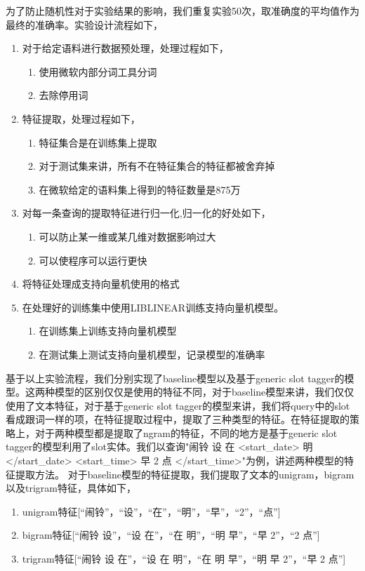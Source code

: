 \documentclass[master]{njuthesis}
\begin{document}
\begin{enumerate}
     为了防止随机性对于实验结果的影响，我们重复实验50次，取准确度的平均值作为最终的准确率。实验设计流程如下，
\begin{enumerate}
  \item 对于给定语料进行数据预处理，处理过程如下，
    \begin{enumerate}
      \item 使用微软内部分词工具分词
      \item 去除停用词
    \end{enumerate}
  \item 特征提取，处理过程如下，
    \begin{enumerate}
      \item 特征集合是在训练集上提取
      \item 对于测试集来讲，所有不在特征集合的特征都被舍弃掉
      \item 在微软给定的语料集上得到的特征数量是875万
    \end{enumerate}
  \item 对每一条查询的提取特征进行归一化,归一化的好处如下，
    \begin{enumerate}
      \item 可以防止某一维或某几维对数据影响过大
      \item 可以使程序可以运行更快
    \end{enumerate}
  \item 将特征处理成支持向量机使用的格式
  \item 在处理好的训练集中使用LIBLINEAR训练支持向量机模型。
    \begin{enumerate}
      \item 在训练集上训练支持向量机模型
      \item 在测试集上测试支持向量机模型，记录模型的准确率
    \end{enumerate}
\end{enumerate}
    
    基于以上实验流程，我们分别实现了baseline模型以及基于generic slot tagger的模型。这两种模型的区别仅仅是使用的特征不同，对于baseline模型来讲，我们仅仅使用了文本特征，对于基于generic slot tagger的模型来讲，我们将query中的slot看成跟词一样的项，在特征提取过程中，提取了三种类型的特征。在特征提取的策略上，对于两种模型都是提取了ngram的特征，不同的地方是基于generic slot tagger的模型利用了slot实体。我们以查询"闹铃 设 在 <start\_date> 明 </start\_date> <start\_time> 早 2 点 </start\_time>"为例，讲述两种模型的特征提取方法。
    对于baseline模型的特征提取，我们提取了文本的unigram，bigram以及trigram特征，具体如下，
    \begin{enumerate}
      \item unigram特征[“闹铃”，“设”，“在”，“明”，“早”，“2”，“点”]
      \item bigram特征[“闹铃 设”，“设 在”，“在 明”，“明 早”，“早 2”，“2 点”]
      \item trigram特征[“闹铃 设 在”，“设 在 明”，“在 明 早”，“明 早 2”，“早 2 点”]
    \end{enumerate}


\end{enumerate}
\end{document}
